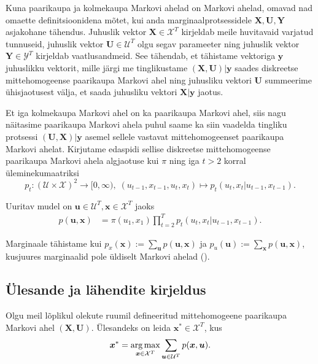 Kuna paarikaupa ja kolmekaupa Markovi ahelad on Markovi ahelad, omavad nad omaette definitsioonidena mõtet, kui anda marginaalprotsessidele $\bm{X},\bm{U},\bm{Y}$ asjakohane tähendus. Juhuslik vektor $\bm{X} \in \mathcal{X}^T$ kirjeldab meile huvitavaid varjatud tunnuseid, juhuslik vektor $\bm{U} \in \mathcal{U}^T$ olgu segav parameeter ning juhuslik vektor $\bm{Y} \in \mathcal{Y}^T$ kirjeldab vaatlusandmeid. See tähendab, et tähistame vektoriga $\bm{y}$ juhuslikku vektorit, mille järgi me tinglikustame $(\bm{X},\bm{U})|\bm{y}$ saades diskreetse mittehomogeense paarikaupa Markovi ahel ning juhusliku vektori $\bm{U}$ summeerime ühisjaotusest välja, et saada juhusliku vektori $\bm{X}|\bm{y}$ jaotus.

Et iga kolmekaupa Markovi ahel on ka paarikaupa Markovi ahel, siis nagu näitasime paarikaupa Markovi ahela puhul saame ka siin vaadelda tingliku protsessi $(\bm{U},\bm{X})|\bm{y}$ asemel sellele vastavat mittehomogeenset paarikaupa Markovi ahelat. Kirjutame edaspidi sellise diskreetse mittehomogeense paarikaupa Markovi ahela algjaotuse kui $\pi$ ning iga $t>2$ korral üleminekumaatriksi 
$$ p_t: (\mathcal{U} \times \mathcal{X})^2 \rightarrow [0, \infty),\; (u_{t-1},x_{t-1},u_t,x_t) \mapsto p_t(u_t,x_t | u_{t-1},x_{t-1}). $$

Uuritav mudel on $\bm{u} \in \mathcal{U}^T, \bm{x} \in \mathcal{X}^T$ jaoks
\begin{align}
    \label{eq:pairwise_markov}
    p(\bm{u},\bm{x}) &= \pi(u_1,x_1) \prod_{t=2}^Tp_t(u_t,x_t|u_{t-1},x_{t-1}).
\end{align}

Marginaale tähistame kui $p_x(\bm{x}) := \sum_{\bm{u}} p(\bm{u},\bm{x})$ ja $p_u(\bm{u}) := \sum_{\bm{x}} p(\bm{u},\bm{x})$, kusjuures marginaalid pole üldiselt Markovi ahelad (\cite{Soop.2023}).

\subsection{Ülesande ja lähendite kirjeldus}

Olgu meil lõplikul olekute ruumil defineeritud mittehomogeene paarikaupa Markovi ahel $(\bm{X},\bm{U})$. Ülesandeks on leida $\bm{x}^* \in \mathcal{X}^T$, kus
\begin{equation}\label{problem_def}
    \bm{x}^*= \operatorname*{arg\,max}_{\bm{x} \in \mathcal{X}^T}\sum_{\bm{u} \in \mathcal{U}^T}{p(\bm{x}, \bm{u})}.
\end{equation}


